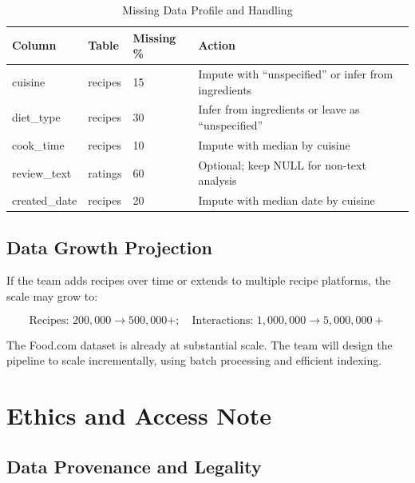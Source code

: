 \documentclass[11pt,a4paper]{article}
\begin{document}
\begin{table}[H]
    \centering
    \begin{tabular}{|p{3cm}|p{2cm}|p{2cm}|p{4cm}|}
        \hline
        \textbf{Column} & \textbf{Table} & \textbf{Missing \%} & \textbf{Action} \\
        \hline
        cuisine & recipes & 15 & Impute with ``unspecified'' or infer from ingredients \\
        \hline
        diet\_type & recipes & 30 & Infer from ingredients or leave as ``unspecified'' \\
        \hline
        cook\_time & recipes & 10 & Impute with median by cuisine \\
        \hline
        review\_text & ratings & 60 & Optional; keep NULL for non-text analysis \\
        \hline
        created\_date & recipes & 20 & Impute with median date by cuisine \\
        \hline
    \end{tabular}
    \caption{Missing Data Profile and Handling}
    \label{tab:missing}
\end{table}

\subsection{Data Growth Projection}

If the team adds recipes over time or extends to multiple recipe platforms, the scale may grow to:

\begin{equation}
\text{Recipes: } 200,000 \to 500,000+; \quad \text{Interactions: } 1,000,000 \to 5,000,000+
\end{equation}

The Food.com dataset is already at substantial scale. The team will design the pipeline to scale incrementally, using batch processing and efficient indexing.

\newpage

\section{Ethics and Access Note}

\subsection{Data Provenance and Legality}
\end{document}
